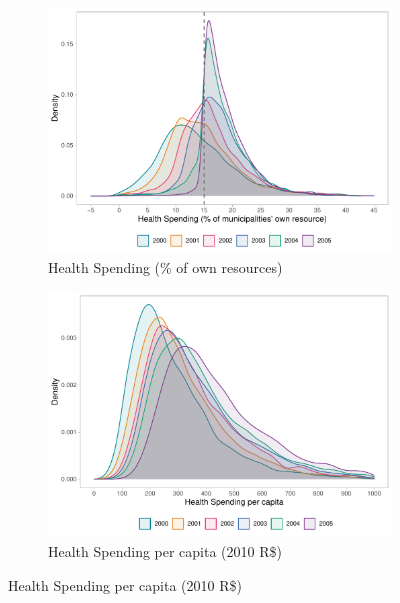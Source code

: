 \begin{figure}[h!]
    \begin{center}
    \caption{\footnotesize Spending Density Plots}\label{fig:density}
    \begin{subfigure}{0.48\textwidth}
        \caption{\scriptsize Health Spending (\% of own resources)}\label{fig:density_a}
        \centering
        \includegraphics[width=\textwidth]{plots/hist_ec29.pdf}
    \end{subfigure}
        \begin{subfigure}{0.48\textwidth}
        \caption{\scriptsize Health Spending per capita (2010 R\$)}\label{fig:density_b}
        \centering
        \includegraphics[width=\textwidth]{plots/hist_pc.pdf}
    \end{subfigure}
    \end{center}\vspace{+1pt}
    

\end{figure}